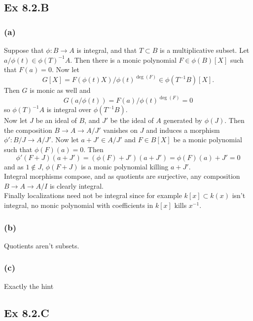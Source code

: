 \documentclass{article}
\theoremstyle{definition}
\begin{document}
\subsection*{Ex 8.2.B}
\subsubsection*{(a)}

Suppose that $\phi : B \to A$ is integral, and that $T \subset B$
is a multiplicative subset. Let $a/\phi(t) \in \phi(T)^{-1}A$.
Then there is a monic polynomial $F \in \phi(B)[X]$ such that $F(a) = 0$.
Now let
\[
	G[X] = F(\phi(t)X)/\phi(t)^{\deg(F)} \in \phi(T^{-1}B)[X].
\]
Then $G$ is monic as well and
\[
	G(a/\phi(t))
	=
	F(a)/\phi(t)^{\deg(F)}
	=
	0
\]
so $\phi(T)^{-1}A$ is integral over $\phi(T^{-1}B)$. \\

Now let $J$ be an ideal of $B$, and $J'$ be the ideal of $A$ generated by
$\phi(J)$. Then the composition $B \to A \to A/J'$ vanishes on $J$ and induces
a morphism $\phi' : B/J \to A/J'$. Now let $a + J' \in A/J'$ and $F \in
	B[X]$ be a monic polynomial such that $\phi(F)(a) = 0$. Then
\[
	\phi'(F + J)(a + J')
	=
	(\phi(F) + J')(a + J')
	=
	\phi(F)(a) + J'
	=
	0
\]
and as $1 \not \in J$, $\phi(F + J)$ is a monic polynomial killing $a + J'$. \\

Integral morphisms compose, and as quotients are surjective, any composition $B
	\to A \to A/I$ is clearly integral. \\

Finally localizations need not be integral since for example $k[x] \subset
	k(x)$ isn't integral, no monic polynomial with coefficients in $k[x]$ kills
$x^{-1}$.


\subsubsection*{(b)}

Quotients aren't subsets.

\subsubsection*{(c)}

Exactly the hint

\subsection*{Ex 8.2.C}
\end{document}
